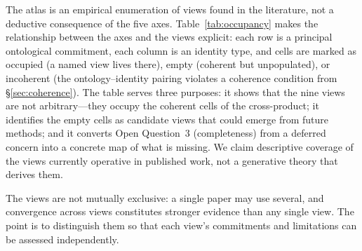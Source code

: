 \documentclass{article}
\begin{document}
The atlas is an empirical enumeration of views found in the literature, not a deductive consequence of the five axes.  Table~\ref{tab:occupancy} makes the relationship between the axes and the views explicit: each row is a principal ontological commitment, each column is an identity type, and cells are marked as occupied (a named view lives there), empty (coherent but unpopulated), or incoherent (the ontology--identity pairing violates a coherence condition from \S\ref{sec:coherence}).  The table serves three purposes: it shows that the nine views are not arbitrary---they occupy the coherent cells of the cross-product; it identifies the empty cells as candidate views that could emerge from future methods; and it converts Open Question~3 (completeness) from a deferred concern into a concrete map of what is missing.  We claim descriptive coverage of the views currently operative in published work, not a generative theory that derives them.

The views are not mutually exclusive: a single paper may use several,
and convergence across views constitutes stronger evidence than any
single view.  The point is to distinguish them so that each view's
commitments and limitations can be assessed independently.
\end{document}
